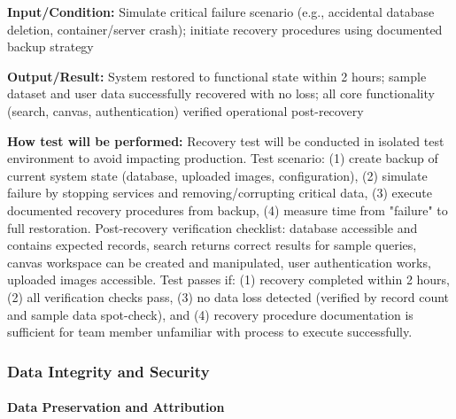 \documentclass[12pt, titlepage]{article}
\begin{document}
\begin{enumerate}
\textbf{Input/Condition:} Simulate critical failure scenario (e.g., accidental database deletion, container/server crash); initiate recovery procedures using documented backup strategy

\textbf{Output/Result:} System restored to functional state within 2 hours; sample dataset and user data successfully recovered with no loss; all core functionality (search, canvas, authentication) verified operational post-recovery

\textbf{How test will be performed:} Recovery test will be conducted in isolated test environment to avoid impacting production. Test scenario: (1) create backup of current system state (database, uploaded images, configuration), (2) simulate failure by stopping services and removing/corrupting critical data, (3) execute documented recovery procedures from backup, (4) measure time from "failure" to full restoration. Post-recovery verification checklist: database accessible and contains expected records, search returns correct results for sample queries, canvas workspace can be created and manipulated, user authentication works, uploaded images accessible. Test passes if: (1) recovery completed within 2 hours, (2) all verification checks pass, (3) no data loss detected (verified by record count and sample data spot-check), and (4) recovery procedure documentation is sufficient for team member unfamiliar with process to execute successfully.

\end{enumerate}

\subsubsection{Data Integrity and Security}

\paragraph{Data Preservation and Attribution}
\end{document}
